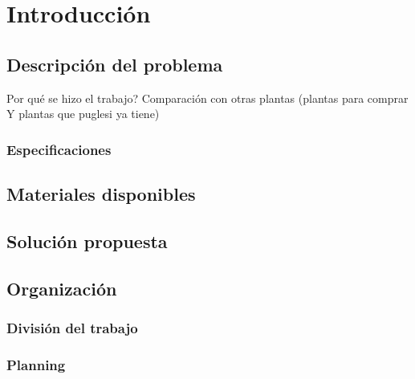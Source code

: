 \chapter{Introducción}
\label{ch:intro}

\section{Descripción del problema}
\label{sec:DescripcionProblema}
Por qué se hizo el trabajo? Comparación con otras plantas
(plantas para comprar Y plantas que puglesi ya tiene)
\subsection{Especificaciones}

\section{Materiales disponibles}
\label{sec:MaterialesDisponibles}

\section{Solución propuesta}
\label{sec:SolucionPropuesta}

\section{Organización}
\label{sec:Organizacion}
\subsection{División del trabajo}
\subsection{Planning}
